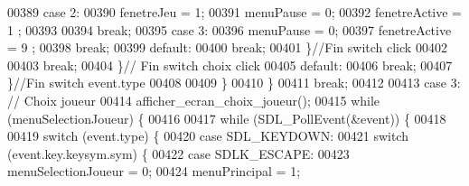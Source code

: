 \begin{DoxyCode}
00389                                                         \textcolor{keywordflow}{case} 2:
00390                                                                 fenetreJeu = 1;
00391                                                                 menuPause = 0;
00392                                                                 fenetreActive = 1
      ;
00393 
00394                                                                 \textcolor{keywordflow}{break};
00395                                                         \textcolor{keywordflow}{case} 3:
00396                                                                 menuPause = 0;
00397                                                                 fenetreActive = 9
      ;
00398                                                                 \textcolor{keywordflow}{break};
00399                                                         \textcolor{keywordflow}{default}:
00400                                                                 \textcolor{keywordflow}{break};
00401                                                         \}\textcolor{comment}{//Fin switch click}
00402 
00403                                                         \textcolor{keywordflow}{break};
00404                                                 \}\textcolor{comment}{// Fin switch choix click}
00405                                         \textcolor{keywordflow}{default}:
00406                                                 \textcolor{keywordflow}{break};
00407                                         \}\textcolor{comment}{//Fin switch event.type}
00408 
00409                                 \}
00410                         \}
00411                         \textcolor{keywordflow}{break};
00412 
00413                 \textcolor{keywordflow}{case} 3: \textcolor{comment}{// Choix joueur}
00414                         afficher\_ecran\_choix\_joueur();
00415                         \textcolor{keywordflow}{while} (menuSelectionJoueur) \{
00416 
00417                                 \textcolor{keywordflow}{while} (SDL\_PollEvent(&event)) \{
00418 
00419                                         \textcolor{keywordflow}{switch} (event.type) \{
00420                                         \textcolor{keywordflow}{case} SDL\_KEYDOWN:
00421                                                 \textcolor{keywordflow}{switch} (event.key.keysym.sym) \{
00422                                                 \textcolor{keywordflow}{case} SDLK\_ESCAPE:
00423                                                         menuSelectionJoueur = 0;
00424                                                         menuPrincipal = 1;

\end{DoxyCode}

